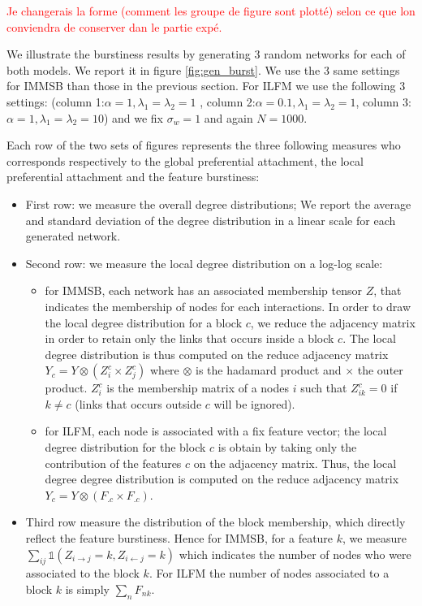 \documentclass[a4paper, 12pt]{article}
\begin{document}
\textcolor{red}{Je changerais la forme (comment les groupe de figure sont plotté) selon ce que lon conviendra de conserver dan le partie expé.}

We illustrate the burstiness results by generating 3 random networks for each of both models. We report it in figure \ref{fig:gen_burst}. We use the 3 same settings for IMMSB  than those in the previous section. For ILFM  we use the following 3 settings: (column 1:$\alpha=1,  \lambda_1=\lambda_2=1$ , column 2:$\alpha=0.1, \lambda_1=\lambda_2=1$, column 3: $\alpha=1, \lambda_1=\lambda_2=10$) and we fix $\sigma_w=1$ and again $N=1000$.

Each row of the two sets of figures represents the three following measures who corresponds respectively to the global preferential attachment, the local preferential attachment and the feature burstiness:
\begin{itemize}
    \item First row: we measure the overall degree distributions; We report the average and standard deviation of the degree distribution in a linear scale for each generated network.
    \item Second row: we measure the local degree distribution on a log-log scale:
        \begin{itemize}
            \item for IMMSB, each network has an associated membership tensor $Z$, that indicates the membership of nodes for each  interactions. In order to draw the local degree distribution for a block $c$, we reduce the adjacency matrix in order to retain only the links that occurs inside a block $c$. The local degree distribution is thus computed on the reduce adjacency matrix $Y_c = Y \otimes (Z_i^c \times Z_j^c)$ where $\otimes$ is the hadamard product and $\times$ the outer product. $Z_i^c$ is the membership matrix of a nodes $i$ such that $Z_{ik}^c=0$ if $k\neq c$ (links that occurs outside $c$ will be ignored).
            \item for ILFM, each node is associated with a fix feature vector; the local degree distribution for the block $c$ is obtain by taking only the contribution of the features $c$ on the adjacency matrix. Thus, the local degree degree distribution is computed on the reduce adjacency matrix $Y_c = Y \otimes (F_{.c}\times F_{.c})$. 
        \end{itemize}
    \item Third row measure the distribution of the block membership, which directly reflect the feature burstiness. Hence for IMMSB, for a feature $k$, we measure $\sum_{ij} \mathds{1}(Z_{i\rightarrow j} = k, Z_{i\leftarrow j} = k)$ which indicates the number of nodes who were associated to the block $k$. For ILFM the number of nodes associated to a block $k$ is simply $\sum_n F_{nk}$.
\end{itemize}
\end{document}
